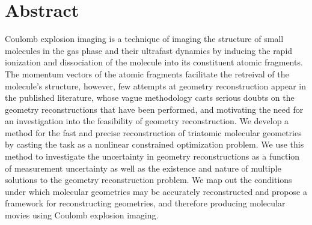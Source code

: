 \begingroup
\let\clearpage\relax
\let\cleardoublepage\relax
\let\cleardoublepage\relax


\chapter*{Abstract}
Coulomb explosion imaging is a technique of imaging the structure of small molecules in the gas phase and their ultrafast dynamics by inducing the rapid ionization and dissociation of the molecule into its constituent atomic fragments. The momentum vectors of the atomic fragments facilitate the retreival of the molecule's structure, however, few attempts at geometry reconstruction appear in the published literature, whose vague methodology casts serious doubts on the geometry reconstructions that have been performed, and motivating the need for an investigation into the feasibility of geometry reconstruction. We develop a method for the fast and precise reconstruction of triatomic molecular geometries by casting the task as a nonlinear constrained optimization problem. We use this method to investigate the uncertainty in geometry reconstructions as a function of measurement uncertainty as well as the existence and nature of multiple solutions to the geometry reconstruction problem. We map out the conditions under which molecular geometries may be accurately reconstructed and propose a framework for reconstructing geometries, and therefore producing molecular movies using Coulomb explosion imaging.


\vfill
\endgroup			
\vfill
